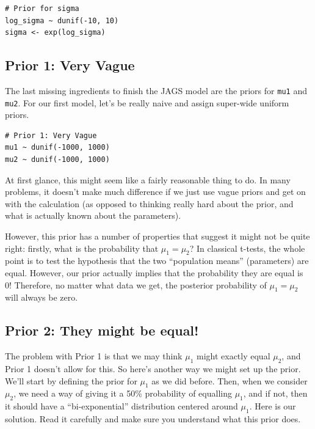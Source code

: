 \begin{verbatim}
# Prior for sigma
log_sigma ~ dunif(-10, 10)
sigma <- exp(log_sigma)
\end{verbatim}

\subsection{Prior 1: Very Vague}
The last missing ingredients to finish the JAGS model are the priors for
{\tt mu1} and {\tt mu2}. For our first model, let's be really naive and assign
super-wide uniform priors.

\begin{verbatim}
# Prior 1: Very Vague
mu1 ~ dunif(-1000, 1000)
mu2 ~ dunif(-1000, 1000)
\end{verbatim}

At first glance, this might seem like a fairly reasonable thing to do. In many
problems, it doesn't make much difference if we just use vague priors and get
on with the calculation (as opposed to thinking really hard about the prior,
and what is actually known about the parameters).

However, this prior has a number of properties that suggest it might not be
quite right: firstly, what is the probability that $\mu_1 = \mu_2$?
In classical t-tests, the whole point is to test the hypothesis that
the two ``population means'' (parameters) are equal. However, our prior
actually implies that the probability they are equal is 0! Therefore, no matter
what data we get, the posterior probability of $\mu_1 = \mu_2$ will always be
zero.

\subsection{Prior 2: They might be equal!}
The problem with Prior 1 is that we may think $\mu_1$ might exactly equal
$\mu_2$, and Prior 1 doesn't allow for this. So here's another way we might
set up the prior. We'll start by defining the prior for $\mu_1$ as we did
before. Then, when we consider $\mu_2$, we need a way of giving it a
50\% probability of equalling $\mu_1$, and if not, then it should have
a ``bi-exponential'' distribution centered around $\mu_1$.
Here is our solution. Read it carefully and make sure you understand what this
prior does.

